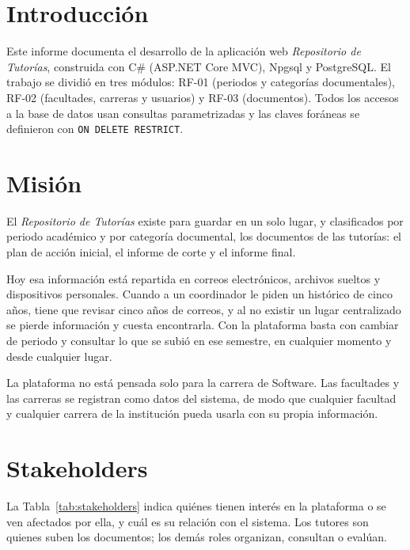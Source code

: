 \documentclass[12pt,a4paper,oneside]{article}
\begin{document}
\section{Introducción}
Este informe documenta el desarrollo de la aplicación web \textit{Repositorio de Tutorías}, construida con C\# (ASP.NET Core MVC), Npgsql y PostgreSQL. El trabajo se dividió en tres módulos: RF-01 (periodos y categorías documentales), RF-02 (facultades, carreras y usuarios) y RF-03 (documentos). Todos los accesos a la base de datos usan consultas parametrizadas y las claves foráneas se definieron con \texttt{ON DELETE RESTRICT}.
\section{Misión}

El \textit{Repositorio de Tutorías} existe para guardar en un solo lugar, y clasificados
por periodo académico y por categoría documental, los documentos de las tutorías: el plan
de acción inicial, el informe de corte y el informe final.

Hoy esa información está repartida en correos electrónicos, archivos sueltos y
dispositivos personales. Cuando a un coordinador le piden un histórico de cinco años,
tiene que revisar cinco años de correos, y al no existir un lugar centralizado se pierde
información y cuesta encontrarla. Con la plataforma basta con cambiar de periodo y
consultar lo que se subió en ese semestre, en cualquier momento y desde cualquier lugar.

La plataforma no está pensada solo para la carrera de Software. Las facultades y las
carreras se registran como datos del sistema, de modo que cualquier facultad y cualquier
carrera de la institución pueda usarla con su propia información.

\section{Stakeholders}

La Tabla~\ref{tab:stakeholders} indica quiénes tienen interés en la plataforma o se ven
afectados por ella, y cuál es su relación con el sistema. Los tutores son quienes suben
los documentos; los demás roles organizan, consultan o evalúan.
\end{document}
